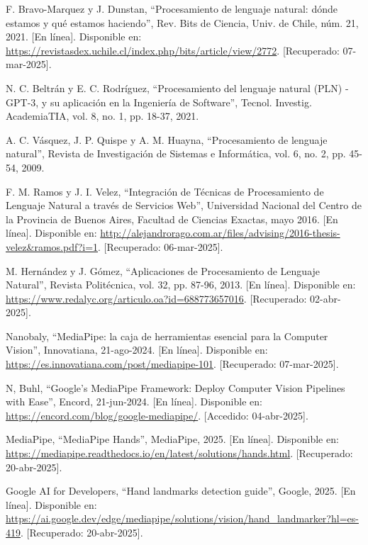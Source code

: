 \begin{thebibliography}{99}
    F. Bravo-Marquez y J. Dunstan, “Procesamiento de lenguaje natural: dónde estamos y qué estamos haciendo”, Rev. Bits de Ciencia, Univ. de Chile, núm. 21, 2021. [En línea]. Disponible en: \url{https://revistasdex.uchile.cl/index.php/bits/article/view/2772}. [Recuperado: 07-mar-2025].
    
    N. C. Beltrán y E. C. Rodríguez, “Procesamiento del lenguaje natural (PLN) -GPT-3, y su aplicación en la Ingeniería de Software”, Tecnol. Investig. AcademiaTIA, vol. 8, no. 1, pp. 18-37, 2021.

    A. C. Vásquez, J. P. Quispe y A. M. Huayna, “Procesamiento de lenguaje natural”, Revista de Investigación de Sistemas e Informática, vol. 6, no. 2, pp. 45-54, 2009.

    F. M. Ramos y J. I. Velez, “Integración de Técnicas de Procesamiento de Lenguaje Natural a través de Servicios Web”, Universidad Nacional del Centro de la Provincia de Buenos Aires, Facultad de Ciencias Exactas, mayo 2016. [En línea]. Disponible en: \url{http://alejandrorago.com.ar/files/advising/2016-thesis-velez&ramos.pdf?i=1}. [Recuperado: 06-mar-2025].

    M. Hernández y J. Gómez, “Aplicaciones de Procesamiento de Lenguaje Natural”, Revista Politécnica, vol. 32, pp. 87-96, 2013. [En línea]. Disponible en: \url{https://www.redalyc.org/articulo.oa?id=688773657016}. [Recuperado: 02-abr-2025].

    Nanobaly, “MediaPipe: la caja de herramientas esencial para la Computer Vision”, Innovatiana, 21-ago-2024. [En línea]. Disponible en: \url{https://es.innovatiana.com/post/mediapipe-101}. [Recuperado: 07-mar-2025].

    N, Buhl, “Google’s MediaPipe Framework: Deploy Computer Vision Pipelines with Ease”, Encord, 21-jun-2024. [En línea]. Disponible en: \url{https://encord.com/blog/google-mediapipe/}. [Accedido: 04-abr-2025].

    MediaPipe, “MediaPipe Hands”, MediaPipe, 2025. [En línea]. Disponible en: \url{https://mediapipe.readthedocs.io/en/latest/solutions/hands.html}. [Recuperado: 20-abr-2025].

    Google AI for Developers, “Hand landmarks detection guide”, Google, 2025. [En línea]. Disponible en: \url{https://ai.google.dev/edge/mediapipe/solutions/vision/hand_landmarker?hl=es-419}. [Recuperado: 20-abr-2025].


\end{thebibliography}
